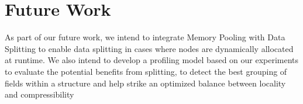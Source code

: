 \section{Future Work}
\label{sec:fut}

As part of our future work, we intend to integrate Memory Pooling with Data
Splitting to enable data splitting in cases where nodes are dynamically
allocated at runtime. We also intend to develop a profiling model based on our
experiments to evaluate the potential benefits from splitting, to detect the
best grouping of fields within a structure and help strike an optimized balance
between locality and compressibility 

